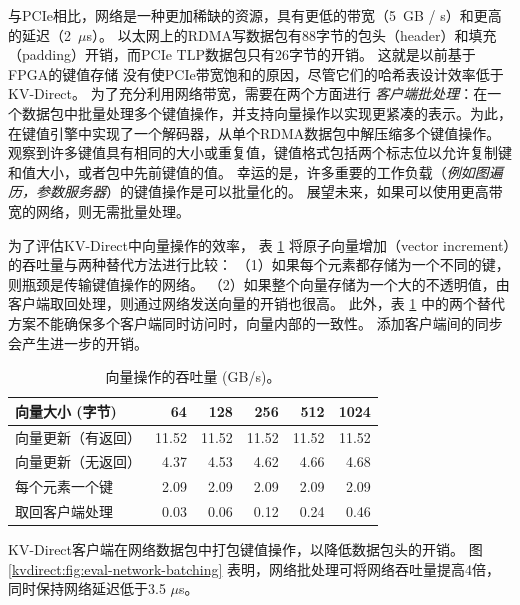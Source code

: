 与PCIe相比，网络是一种更加稀缺的资源，具有更低的带宽（5~GB / s）和更高的延迟（2~$\mu$s）。
以太网上的RDMA写数据包有88字节的包头（header）和填充（padding）开销，而PCIe TLP数据包只有26字节的开销。
这就是以前基于FPGA的键值存储 \cite{blott13hotcloud,blott2015scaling} 没有使PCIe带宽饱和的原因，尽管它们的哈希表设计效率低于KV-Direct。
为了充分利用网络带宽，需要在两个方面进行 \textit {客户端批处理}：在一个数据包中批量处理多个键值操作，并支持向量操作以实现更紧凑的表示。为此，在键值引擎中实现了一个解码器，从单个RDMA数据包中解压缩多个键值操作。
观察到许多键值具有相同的大小或重复值，键值格式包括两个标志位以允许复制键和值大小，或者包中先前键值的值。
幸运的是，许多重要的工作负载（\textit {例如图遍历，参数服务器}）的键值操作是可以批量化的。
展望未来，如果可以使用更高带宽的网络，则无需批量处理。


为了评估KV-Direct中向量操作的效率，
表 \ref {kvdirect:tab:vec_throughput} 将原子向量增加（vector increment）的吞吐量与两种替代方法进行比较：
（1）如果每个元素都存储为一个不同的键，则瓶颈是传输键值操作的网络。
（2）如果整个向量存储为一个大的不透明值，由客户端取回处理，则通过网络发送向量的开销也很高。
此外，表 \ref {kvdirect:tab:vec_throughput} 中的两个替代方案不能确保多个客户端同时访问时，向量内部的一致性。 添加客户端间的同步会产生进一步的开销。


\begin{table}[htbp]
	\centering
	\caption{向量操作的吞吐量 (GB/s)。}
	\label{kvdirect:tab:vec_throughput}
	\small
		\begin{tabular}{|l|r|r|r|r|r|}
			\hline
			向量大小 (字节)              & 64    & 128   & 256   & 512   & 1024  \\ \hline
			向量更新（有返回）    & 11.52 & 11.52 & 11.52 & 11.52 & 11.52 \\ \hline
			向量更新（无返回） & 4.37  & 4.53  & 4.62  & 4.66  & 4.68  \\ \hline
			每个元素一个键         & 2.09  & 2.09  & 2.09  & 2.09  & 2.09  \\ \hline
			取回客户端处理             & 0.03  & 0.06  & 0.12  & 0.24  & 0.46  \\ \hline
		\end{tabular}
\end{table}




KV-Direct客户端在网络数据包中打包键值操作，以降低数据包头的开销。
图 \ref {kvdirect:fig:eval-network-batching} 表明，网络批处理可将网络吞吐量提高4倍，同时保持网络延迟低于3.5 $\mu$s。


